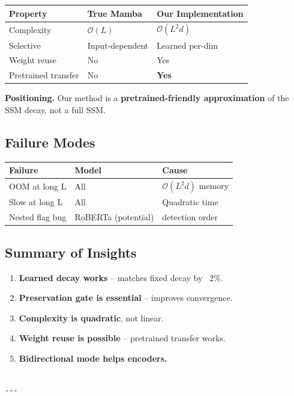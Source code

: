\begin{table}[H]
\centering
\small
\begin{tabular}{lll}
\toprule
\textbf{Property} & \textbf{True Mamba} & \textbf{Our Implementation} \\
\midrule
Complexity & $\mathcal{O}(L)$ & $\mathcal{O}(L^2 d)$ \\
Selective & Input-dependent & Learned per-dim \\
Weight reuse & No & Yes \\
Pretrained transfer & No & \textbf{Yes} \\
\bottomrule
\end{tabular}
\end{table}

\textbf{Positioning.} Our method is a \textbf{pretrained-friendly approximation} of 
the SSM decay, not a full SSM.

\subsection{Failure Modes}

\begin{table}[H]
\centering
\small
\begin{tabular}{lll}
\toprule
\textbf{Failure} & \textbf{Model} & \textbf{Cause} \\
\midrule
OOM at long L & All & $\mathcal{O}(L^2 d)$ memory \\
Slow at long L & All & Quadratic time \\
Nested flag bug & RoBERTa (potential) & detection order \\
\bottomrule
\end{tabular}
\end{table}

\subsection{Summary of Insights}

\begin{enumerate}
\item \textbf{Learned decay works} -- matches fixed decay by ~2\%.
\item \textbf{Preservation gate is essential} -- improves convergence.
\item \textbf{Complexity is quadratic}, not linear.
\item \textbf{Weight reuse is possible} -- pretrained transfer works.
\item \textbf{Bidirectional mode helps encoders.}
\end{enumerate}
\begin{lstlisting}

---
\end{lstlisting}